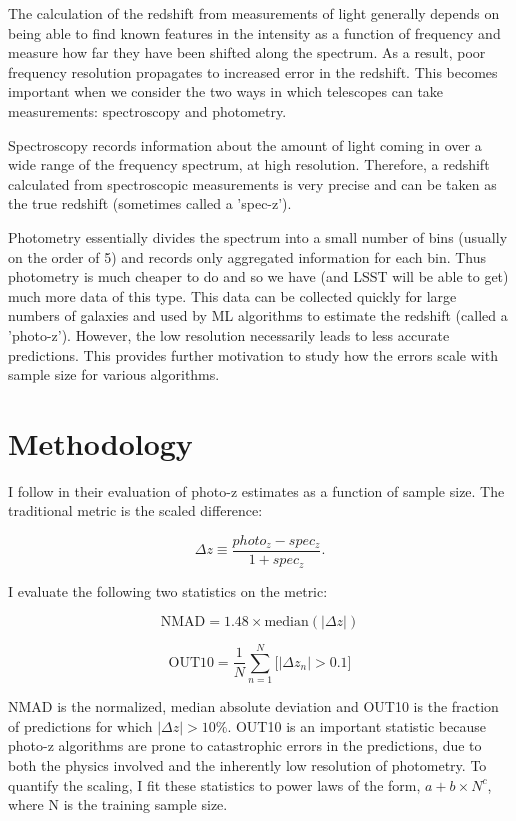 \documentclass[13pt]{amsart}
\newcommand{\nequ}[2]{\begin{equation}#1 \label{#2}\end{equation}}
\newcommand{\equin}[1]{\(#1\)}
\begin{document}
      The calculation of the redshift from measurements of light generally depends on being able to find known features in the intensity as a function of frequency and measure how far they have been shifted along the spectrum. As a result, poor frequency resolution propagates to increased error in the redshift. This becomes important when we consider the two ways in which telescopes can take measurements: spectroscopy and photometry.

      Spectroscopy records information about the amount of light coming in over a wide range of the frequency spectrum, at high resolution. Therefore, a redshift calculated from spectroscopic measurements is very precise and can be taken as the true redshift (sometimes called a 'spec-z').

      Photometry essentially divides the spectrum into a small number of bins (usually on the order of 5) and records only aggregated information for each bin. Thus photometry is much cheaper to do and so we have (and LSST will be able to get) much more data of this type. This data can be collected quickly for large numbers of galaxies and used by ML algorithms to estimate the redshift (called a 'photo-z'). However, the low resolution necessarily leads to less accurate predictions. This provides further motivation to study how the errors scale with sample size for various algorithms.


\section{Methodology}

  I follow \cite{newman} in their evaluation of photo-z estimates as a function of sample size. The traditional metric is the scaled difference:

  \nequ{\Delta z \equiv \frac{photo_z-spec_z}{1+spec_z}.}{equ:deltaz}

  I evaluate the following two statistics on the metric:

  \nequ{\textrm{NMAD} = 1.48 \times \textrm{median}(|\Delta z|)}{equ:nmad}

  \nequ{\textrm{OUT10} = \frac{1}{N} \sum_{n=1}^N \big[ | \Delta z_n | > 0.1 \big]}{equ:out10}

  NMAD is the normalized, median absolute deviation and OUT10 is the fraction of predictions for which \equin{|\Delta z| > 10\%}. OUT10 is an important statistic because photo-z algorithms are prone to catastrophic errors in the predictions, due to both the physics involved and the inherently low resolution of photometry. To quantify the scaling, I fit these statistics to power laws of the form, \equin{a+b \times N^c}, where N is the training sample size.
\end{document}
